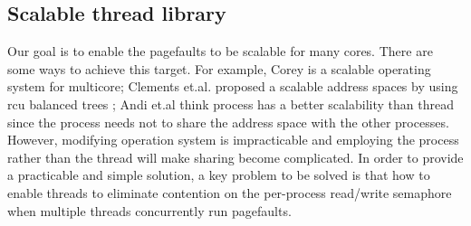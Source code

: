 %
%
%
%
%
%
%
%
%

\subsection{Scalable thread library}

Our goal is to enable the pagefaults to be scalable  for many cores.
There are some ways to achieve this target. 
For example, Corey\cite{boyd2008corey} is a scalable operating system for multicore;
Clements et.al. proposed a scalable address spaces by using rcu balanced trees \cite{Clements2012Scalable};
Andi et.al think process has a better scalability than thread since the process needs not to share the address space with the other processes\cite{Andi2009lmulticore}.
However, modifying operation system is impracticable and employing the process rather than the thread will make sharing become complicated. 
In order to provide a practicable and simple solution, a key problem to be solved is that how to enable threads to eliminate contention on the per-process read/write semaphore when multiple threads concurrently run pagefaults.



